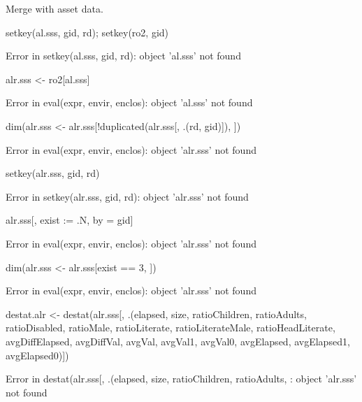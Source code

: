 Merge with asset data.
\begin{Schunk}
\begin{Sinput}
setkey(al.sss, gid, rd); setkey(ro2, gid)
\end{Sinput}
\begin{Soutput}
Error in setkey(al.sss, gid, rd): object 'al.sss' not found
\end{Soutput}
\begin{Sinput}
alr.sss <- ro2[al.sss]	
\end{Sinput}
\begin{Soutput}
Error in eval(expr, envir, enclos): object 'al.sss' not found
\end{Soutput}
\begin{Sinput}
dim(alr.sss <- alr.sss[!duplicated(alr.sss[, .(rd, gid)]), ])
\end{Sinput}
\begin{Soutput}
Error in eval(expr, envir, enclos): object 'alr.sss' not found
\end{Soutput}
\begin{Sinput}
setkey(alr.sss, gid, rd)
\end{Sinput}
\begin{Soutput}
Error in setkey(alr.sss, gid, rd): object 'alr.sss' not found
\end{Soutput}
\begin{Sinput}
alr.sss[, exist := .N, by = gid]
\end{Sinput}
\begin{Soutput}
Error in eval(expr, envir, enclos): object 'alr.sss' not found
\end{Soutput}
\begin{Sinput}
dim(alr.sss <- alr.sss[exist == 3, ])
\end{Sinput}
\begin{Soutput}
Error in eval(expr, envir, enclos): object 'alr.sss' not found
\end{Soutput}
\begin{Sinput}
destat.alr <- destat(alr.sss[, .(elapsed, 
	size, ratioChildren, ratioAdults, ratioDisabled, ratioMale, ratioLiterate, 
	ratioLiterateMale, ratioHeadLiterate, avgDiffElapsed,
	avgDiffVal, avgVal, avgVal1, avgVal0, avgElapsed, avgElapsed1, avgElapsed0)])
\end{Sinput}
\begin{Soutput}
Error in destat(alr.sss[, .(elapsed, size, ratioChildren, ratioAdults, : object 'alr.sss' not found
\end{Soutput}
\begin{Sinput}

\end{Sinput}
\end{Schunk}
